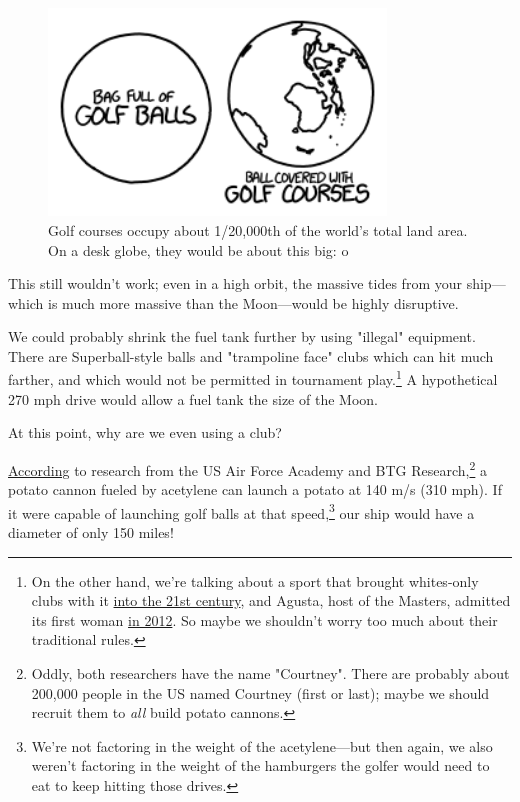 {\begin{figure}[!htbp]
\centering
\includegraphics[scale=0.5, max width=0.8\textwidth]{imgs/a/85/golf_237.png}
\caption{Golf courses occupy about 1/20,000th of the world's total land area. On a desk globe, they would be about this big: o}
\end{figure}

{This still wouldn't work; even in a high orbit, the massive tides from your ship—which is much more massive than the Moon—would be highly disruptive.}

{We could probably shrink the fuel tank further by using "illegal" equipment. There are Superball-style balls and "trampoline face" clubs which can hit much farther, and which would not be permitted in tournament play.{\footnote{On the other hand, we're talking about a sport that brought whites-only clubs with it \href{http://www.washingtonpost.com/wp-dyn/content/article/2010/06/01/AR2010060103918.html}{into the 21st century}, and Agusta, host of the Masters, admitted its first woman \href{http://www.reuters.com/article/2012/08/20/us-golf-augusta-idUSBRE87J0IE20120820} {in 2012}. So maybe we shouldn't worry too much about their traditional rules.} } A hypothetical 270 mph drive would allow a fuel tank the size of the Moon.}

{At this point, why are we even using a club?}

{ \href{http://arxiv.org/abs/1305.0966}{According} to research from the US Air Force Academy and BTG Research,{\footnote{Oddly, both researchers have the name "Courtney". There are probably about 200,000 people in the US named Courtney (first or last); maybe we should recruit them to \emph{all} build potato cannons.} } a potato cannon fueled by acetylene can launch a potato at 140 m/s (310 mph). If it were capable of launching golf balls at that speed,{\footnote{We're not factoring in the weight of the acetylene—but then again, we also weren't factoring in the weight of the hamburgers the golfer would need to eat to keep hitting those drives.} } our ship would have a diameter of only 150 miles!}

}

